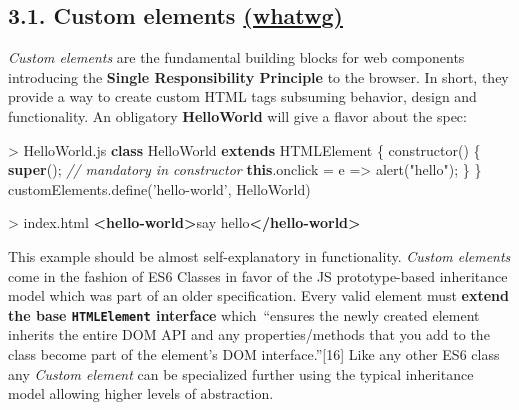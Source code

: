 \documentclass[]{article}
\newenvironment{Shaded}{}{}
\newcommand{\KeywordTok}[1]{\textcolor[rgb]{0.00,0.44,0.13}{\textbf{{#1}}}}
\newcommand{\StringTok}[1]{\textcolor[rgb]{0.25,0.44,0.63}{{#1}}}
\newcommand{\CommentTok}[1]{\textcolor[rgb]{0.38,0.63,0.69}{\textit{{#1}}}}
\newcommand{\VariableTok}[1]{\textcolor[rgb]{0.10,0.09,0.49}{{#1}}}
\newcommand{\OperatorTok}[1]{\textcolor[rgb]{0.40,0.40,0.40}{{#1}}}
\newcommand{\AttributeTok}[1]{\textcolor[rgb]{0.49,0.56,0.16}{{#1}}}
\newcommand{\NormalTok}[1]{{#1}}
\begin{document}
\subsection{\texorpdfstring{3.1. Custom elements
\href{https://html.spec.whatwg.org/multipage/scripting.html\#custom-elements}{(whatwg)}}{3.1. Custom elements (whatwg)}}\label{custom-elements-whatwg}

\emph{Custom elements} are the fundamental building blocks for web
components introducing the \textbf{Single Responsibility Principle} to
the browser. In short, they provide a way to create custom HTML tags
subsuming behavior, design and functionality. An obligatory
\textbf{HelloWorld} will give a flavor about the spec:

\begin{Shaded}
\begin{Highlighting}[]
\OperatorTok{>} \VariableTok{HelloWorld}\NormalTok{.}\AttributeTok{js}
\KeywordTok{class} \NormalTok{HelloWorld }\KeywordTok{extends} \NormalTok{HTMLElement }\OperatorTok{\{}
 \AttributeTok{constructor}\NormalTok{() }\OperatorTok{\{}
  \KeywordTok{super}\NormalTok{()}\OperatorTok{;} \CommentTok{// mandatory in constructor}
  \KeywordTok{this}\NormalTok{.}\AttributeTok{onclick} \OperatorTok{=} \NormalTok{e }\OperatorTok{=>} \AttributeTok{alert}\NormalTok{(}\StringTok{"hello"}\NormalTok{)}\OperatorTok{;}
 \OperatorTok{\}}
\OperatorTok{\}}
\VariableTok{customElements}\NormalTok{.}\AttributeTok{define}\NormalTok{(}\StringTok{'hello-world'}\OperatorTok{,} \NormalTok{HelloWorld)}
\end{Highlighting}
\end{Shaded}

\begin{Shaded}
\begin{Highlighting}[]
\NormalTok{> index.html}
\KeywordTok{<hello-world>}\NormalTok{say hello}\KeywordTok{</hello-world>}
\end{Highlighting}
\end{Shaded}

This example should be almost self-explanatory in functionality.
\emph{Custom elements} come in the fashion of ES6 Classes in favor of
the JS prototype-based inheritance model which was part of an older
specification. Every valid element must \textbf{extend the base
\texttt{HTMLElement} interface} which~``ensures the newly created
element inherits the entire DOM API and any properties/methods that you
add to the class become part of the element's DOM interface.''{[}16{]}
Like any other ES6 class any \emph{Custom element} can be specialized
further using the typical inheritance model allowing higher levels of
abstraction.
\end{document}
